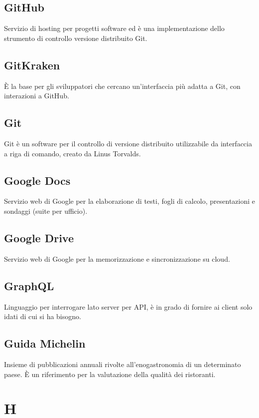 \documentclass{classes/base}
\begin{document}
        \subsection*{GitHub}
        Servizio di hosting per progetti software ed è una implementazione dello strumento di controllo versione distribuito Git.

        \subsection*{GitKraken}
        È la base per gli sviluppatori che cercano un'interfaccia più adatta a Git, con interazioni a GitHub. 

        \subsection*{Git}
        Git è un software per il controllo di versione distribuito utilizzabile da interfaccia a riga di comando, creato da Linus Torvalds.
        
        \subsection*{Google Docs}
        Servizio web di Google per la elaborazione di testi, fogli di calcolo, presentazioni e sondaggi (suite per ufficio).
        
        \subsection*{Google Drive}
        Servizio web di Google per la memorizzazione e sincronizzazione su cloud.

        \subsection*{GraphQL}
        Linguaggio per interrogare lato server per API, è in grado di fornire ai client solo idati di cui si ha bisogno.

        \subsection*{Guida Michelin} 
        Insieme di pubblicazioni annuali rivolte all'enogastronomia di un determinato paese. È un riferimento per la valutazione della qualità dei ristoranti.
        \newpage  
    \section{H}
    \newpage  
\end{document}
